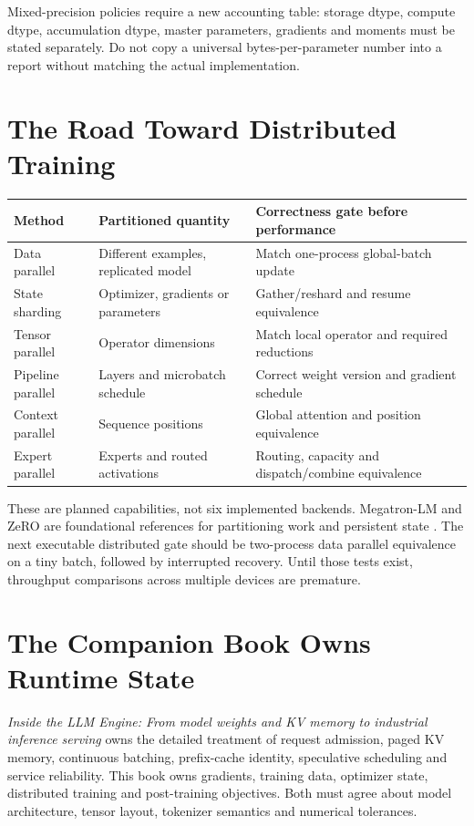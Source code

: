 Mixed-precision policies require a new accounting table: storage dtype,
compute dtype, accumulation dtype, master parameters, gradients and moments
must be stated separately. Do not copy a universal bytes-per-parameter number
into a report without matching the actual implementation.

\section{The Road Toward Distributed Training}

\begin{center}
\begin{tabular}{p{2.1cm}p{4.3cm}p{6cm}}\toprule
Method & Partitioned quantity & Correctness gate before performance \\\midrule
Data parallel & Different examples, replicated model & Match one-process global-batch update \\
State sharding & Optimizer, gradients or parameters & Gather/reshard and resume equivalence \\
Tensor parallel & Operator dimensions & Match local operator and required reductions \\
Pipeline parallel & Layers and microbatch schedule & Correct weight version and gradient schedule \\
Context parallel & Sequence positions & Global attention and position equivalence \\
Expert parallel & Experts and routed activations & Routing, capacity and dispatch/combine equivalence \\\bottomrule
\end{tabular}
\end{center}

These are planned capabilities, not six implemented backends. Megatron-LM and
ZeRO are foundational references for partitioning work and persistent state
\cite{shoeybi2019megatron,rajbhandari2020zero}. The next executable distributed
gate should be two-process data parallel equivalence on a tiny batch, followed
by interrupted recovery. Until those tests exist, throughput comparisons across
multiple devices are premature.

\section{The Companion Book Owns Runtime State}

\emph{Inside the LLM Engine: From model weights and KV memory to industrial
inference serving} owns the detailed treatment of request admission, paged KV
memory, continuous batching, prefix-cache identity, speculative scheduling and
service reliability. This book owns gradients, training data, optimizer state,
distributed training and post-training objectives. Both must agree about model
architecture, tensor layout, tokenizer semantics and numerical tolerances.

